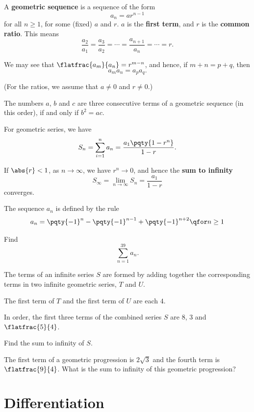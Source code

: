 \documentclass{article}
\begin{document}
A \textbf{geometric sequence} is a sequence of the form
\[
    a_n = a r^{n - 1}
\]
for all \(n \geq 1\), for some (fixed) \(a\) and \(r\). \(a\) is the \textbf{first term}, and \(r\) is the \textbf{common ratio}. This means
\[
    \frac{a_2}{a_1} = \frac{a_3}{a_2} = \cdots = \frac{a_{n + 1}}{a_n} = \cdots = r.
\]

We may see that \(\flatfrac{a_m}{a_n} = r^{m - n}\), and hence, if \(m + n = p + q\), then
\[
    a_m a_n = a_p a_q.
\]

(For the ratios, we assume that \(a \neq 0\) and \(r \neq 0\).)

The numbers \(a\), \(b\) and \(c\) are three consecutive terms of a geometric sequence (in this order), if and only if \(b^2 = ac\).

For geometric series, we have
\[
    S_n = \sum_{i = 1}^{n} a_n = \frac{a_1 \pqty{1 - r^n}}{1 - r}.
\]

If \(\abs{r} < 1\), as \(n \to \infty\), we have \(r^n \to 0\), and hence the \textbf{sum to infinity}
\[
    S_\infty = \lim_{n \to \infty} S_n = \frac{a_1}{1 - r}
\]
converges.

\begin{example}[TMUA 2016 P1 Q4]
    The sequence \(a_n\) is defined by the rule
    \[
        a_n = \pqty{-1}^{n} - \pqty{-1}^{n - 1} + \pqty{-1}^{n + 2} \qfor n \geq 1
    \]

    Find
    \[
        \sum_{n = 1}^{39} a_n.
    \]
\end{example}

\begin{example}[TMUA 2016 P1 Q14]
    The terms of an infinite series \(S\) are formed by adding together the corresponding terms in two infinite geometric series, \(T\) and \(U\).

    The first term of \(T\) and the first term of \(U\) are each \(4\).

    In order, the first three terms of the combined series \(S\) are \(8\), \(3\) and \(\flatfrac{5}{4}\).

    Find the sum to infinity of \(S\).
\end{example}

\begin{example}[TMUA 2017 P2 Q3]
    The first term of a geometric progression is \(2 \sqrt{3}\) and the fourth term is \(\flatfrac{9}{4}\). What is the sum to infinity of this geometric progression?
\end{example}

\section{Differentiation}
\end{document}
